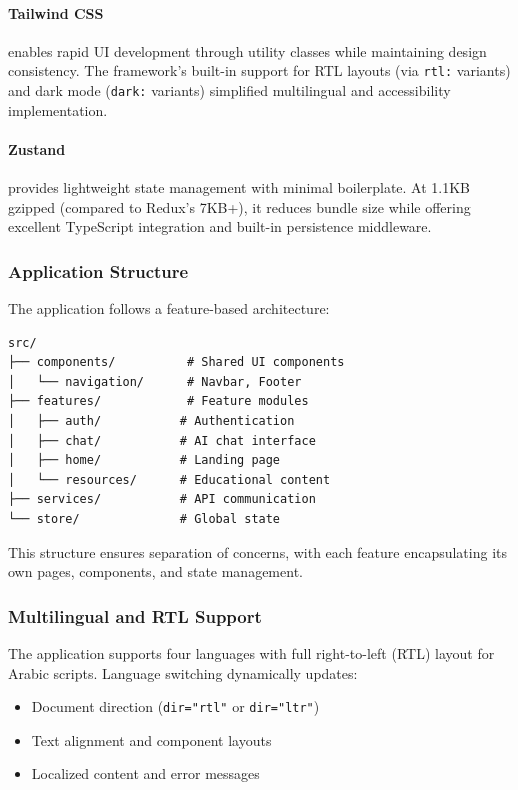 \paragraph{Tailwind CSS} enables rapid UI development through utility classes while maintaining design consistency. The framework's built-in support for RTL layouts (via \texttt{rtl:} variants) and dark mode (\texttt{dark:} variants) simplified multilingual and accessibility implementation.

\paragraph{Zustand} provides lightweight state management with minimal boilerplate. At 1.1KB gzipped (compared to Redux's 7KB+), it reduces bundle size while offering excellent TypeScript integration and built-in persistence middleware.

\subsubsection{Application Structure}

The application follows a feature-based architecture:

\begin{verbatim}
src/
├── components/          # Shared UI components
│   └── navigation/      # Navbar, Footer
├── features/            # Feature modules
│   ├── auth/           # Authentication
│   ├── chat/           # AI chat interface
│   ├── home/           # Landing page
│   └── resources/      # Educational content
├── services/           # API communication
└── store/              # Global state
\end{verbatim}

This structure ensures separation of concerns, with each feature encapsulating its own pages, components, and state management.

\subsubsection{Multilingual and RTL Support}

The application supports four languages with full right-to-left (RTL) layout for Arabic scripts. Language switching dynamically updates:

\begin{itemize}
    \item Document direction (\texttt{dir="rtl"} or \texttt{dir="ltr"})
    \item Text alignment and component layouts
    \item Localized content and error messages
\end{itemize}

